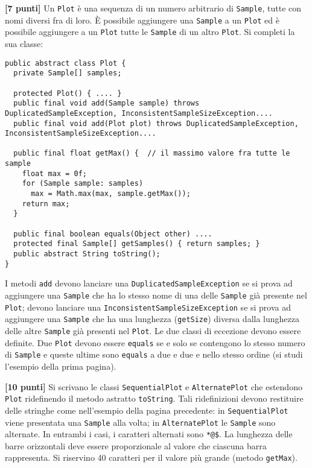 \documentclass{article}[10pt]
\newcounter{esnu}
\newenvironment{esercizio}{\medskip \noindent {\bf Esercizio\addtocounter{esnu}{1} \arabic{esnu}}}{}
\begin{document}
\begin{esercizio}
\textbf{[7 punti]}
Un \texttt{Plot} \`e una sequenza di un numero arbitrario di \texttt{Sample}, tutte con nomi diversi
fra di loro. \`E possibile
aggiungere una \texttt{Sample} a un \texttt{Plot} ed \`e possibile aggiungere a un \texttt{Plot} tutte le
\texttt{Sample} di un altro \texttt{Plot}. Si completi la sua classe:

{\small
\begin{verbatim}
public abstract class Plot {
  private Sample[] samples;

  protected Plot() { .... }
  public final void add(Sample sample) throws DuplicatedSampleException, InconsistentSampleSizeException....
  public final void add(Plot plot) throws DuplicatedSampleException, InconsistentSampleSizeException....

  public final float getMax() {  // il massimo valore fra tutte le sample
    float max = 0f;
    for (Sample sample: samples)
      max = Math.max(max, sample.getMax());
    return max;
  }

  public final boolean equals(Object other) ....
  protected final Sample[] getSamples() { return samples; }
  public abstract String toString();
}
\end{verbatim}}

\noindent
I metodi \texttt{add} devono lanciare una \texttt{DuplicatedSampleException} se si prova ad aggiungere
una \texttt{Sample} che ha lo stesso nome di una delle \texttt{Sample} gi\`a presente nel \texttt{Plot};
devono lanciare una \texttt{InconsistentSampleSizeException} se si prova ad aggiungere una \texttt{Sample}
che ha una lunghezza (\texttt{getSize}) diversa dalla lunghezza delle altre \texttt{Sample} gi\`a presenti
nel \texttt{Plot}. Le due classi di eccezione devono essere definite.
Due \texttt{Plot} devono essere \texttt{equals} se e solo se contengono lo stesso numero di \texttt{Sample}
e queste ultime sono \texttt{equals} a due e due e nello stesso ordine (si
studi l'esempio della prima pagina).
\end{esercizio}

\begin{esercizio}
\textbf{[10 punti]}
Si scrivano le classi \texttt{SequentialPlot} e \texttt{AlternatePlot} che estendono
\texttt{Plot} ridefinendo il metodo astratto \texttt{toString}. Tali ridefinizioni devono restituire
delle stringhe come nell'esempio della pagina precedente: in \texttt{SequentialPlot}
viene presentata una \texttt{Sample} alla volta; in \texttt{AlternatePlot} le \texttt{Sample}
sono alternate. In entrambi i casi, i caratteri alternati sono \texttt{*@\$}. La lunghezza delle
barre orizzontali deve essere proporzionale al valore che ciascuna barra
rappresenta. Si riservino 40 caratteri per il valore pi\`u grande (metodo \texttt{getMax}).
\end{esercizio}
\end{document}
